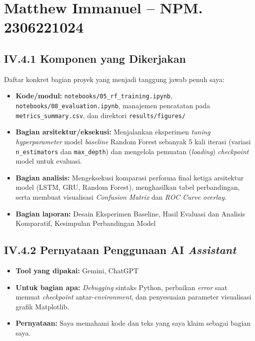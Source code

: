 \documentclass[11pt,a4paper,oneside]{report}
\begin{document}
\section{Matthew Immanuel -- NPM. 2306221024}

\subsection*{IV.4.1 Komponen yang Dikerjakan}
Daftar konkret bagian proyek yang menjadi tanggung jawab penuh saya:
\begin{itemize}[leftmargin=*]
    \item \textbf{Kode/modul:} \texttt{notebooks/05\_rf\_training.ipynb}, \texttt{notebooks/08\_evaluation.ipynb}, manajemen pencatatan pada \texttt{metrics\_summary.csv}, dan direktori \texttt{results/figures/}
    \item \textbf{Bagian arsitektur/eksekusi:} Menjalankan eksperimen \textit{tuning hyperparameter} model \textit{baseline} Random Forest sebanyak 5 kali iterasi (variasi \texttt{n\_estimators} dan \texttt{max\_depth}) dan mengelola pemuatan (\textit{loading}) \textit{checkpoint} model untuk evaluasi.
    \item \textbf{Bagian analisis:} Mengeksekusi komparasi performa final ketiga arsitektur model (LSTM, GRU, Random Forest), menghasilkan tabel perbandingan, serta membuat visualisasi \textit{Confusion Matrix} dan \textit{ROC Curve overlay}.
    \item \textbf{Bagian laporan:} Desain Eksperimen Baseline, Hasil Evaluasi dan Analisis Komparatif, Kesimpulan Perbandingan Model
\end{itemize}

\subsection*{IV.4.2 Pernyataan Penggunaan AI \textit{Assistant}}
\begin{itemize}[leftmargin=*]
    \item \textbf{Tool yang dipakai:} Gemini, ChatGPT
    \item \textbf{Untuk bagian apa:} \textit{Debugging} sintaks Python, perbaikan \textit{error} saat memuat \textit{checkpoint} antar-\textit{environment}, dan penyesuaian parameter visualisasi grafik Matplotlib.
    \item \textbf{Pernyataan:} Saya memahami kode dan teks yang saya klaim sebagai bagian saya.
\end{itemize}
\end{document}
